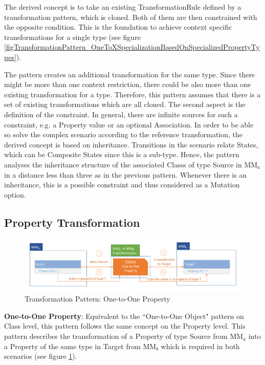 The derived concept is to take an existing \gls{TransformationRule} defined by a transformation pattern, which is cloned. Both of them are then constrained with the opposite condition. This is the foundation to achieve context specific transformations for a single type (see figure \ref{figTransformationPattern_OneToXSpecializationBasedOnSpecializedPropertyTypes}).

The pattern creates an additional transformation for the same type. Since there might be more than one context restriction, there could be also more than one existing transformation for a type. Therefore, this pattern assumes that there is a set of existing transformations which are all cloned. The second aspect is the definition of the constraint. In general, there are infinite sources for such a constraint, e.g. a \gls{Property} value or an optional \gls{Association}. In order to be able so solve the complex scenario according to the reference transformation, the derived concept is based on inheritance. Transitions in the scenario relate States, which can be Composite States since this is a sub-type. Hence, the pattern analyses the inheritance structure of the associated \glspl{Class} of type Source in MM$_a$ in a distance less than three as in the previous pattern. Whenever there is an inheritance, this is a possible constraint and thus considered as a \gls{Mutation} option.

  
\subsection{Property Transformation} 
  
\begin{figure}[!ht]
	\centering
	\includegraphics[scale=0.48, trim=0cm 0cm 0cm 0cm, clip=true]{Images/TransformationPattern_OneToOneProperty.pdf} 
	\caption{Transformation Pattern: One-to-One Property}
	\label{figTransformationPattern_OneToOneProperty}
\end{figure} 
 
\textbf{One-to-One Property}: Equivalent to the ``One-to-One Object" pattern on \gls{Class} level, this pattern follows the same concept on the \gls{Property} level. This pattern describes the transformation of a \gls{Property} of type Source from MM$_a$ into a \gls{Property} of the same type in Target from MM$_b$ which is required in both scenarios (see figure \ref{figTransformationPattern_OneToOneProperty}).


